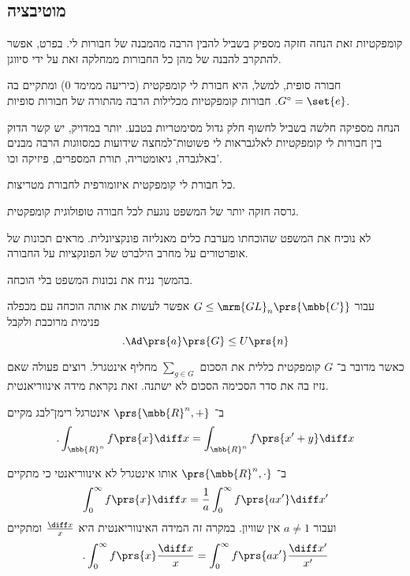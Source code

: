 \documentclass[10pt, twoside]{book}
\newcommand{\textenglish}[1]{\foreignlanguage{english}{#1}}
\begin{document}
\subsection{מוטיבציה}

קומפקטיות זאת הנחה חזקה מספיק בשביל להבין הרבה מהמבנה של חבורות לי. בפרט, אפשר להתקרב להבנה של מהן כל החבורות ממחלקה זאת על ידי סיווגן.

חבורה סופית, למשל, היא חבורת לי קומפקטית (כיריעה ממימד 0) ומתקיים בה
$G^\circ = \set{e}$.
חבורות קומפקטיות מכלילות הרבה מהתורה של חבורות סופיות.

הנחה מספיקה חלשה בשביל לחשוף חלק גדול מסימטריות בטבע. יותר במדויק, יש קשר הדוק בין חבורות לי קומפקטיות לאלגבראות לי פשוטות־למחצה שידועות כמסווגות הרבה מבנים באלגברה, גיאומטריה, תורת המספרים, פיזיקה וכו'.

\begin{theorem}[\textenglish{Peter-Weyl}]
כל חבורת לי קומפקטית איזומורפית לחבורת מטריצות.
\end{theorem}

\begin{remark}
גרסה חזקה יותר של המשפט נוגעת לכל חבורה טופולוגית קומפקטית.

לא נוכיח את המשפט שהוכחתו מערבת כלים מאנליזה פונקציונלית. מראים תכונות של אופרטורים על מחרב הילברט של הפונקציות על החבורה.

בהמשך נניח את נכונות המשפט בלי הוכחה.
\end{remark}



\begin{remark}
עבור
$G \leq \mrm{GL}_n\prs{\mbb{C}}$
אפשר לעשות את אותה הוכחה עם מכפלה פנימית מרוכבת ולקבל
\[\text{.} \Ad\prs{a}\prs{G} \leq U\prs{n}\]

כאשר מדובר ב־%
$G$
קומפקטית כללית את הסכום
$\sum_{g \in G}$
מחליף אינטגרל. רוצים פעולה שאם נזיז בה את סדר הסכימה הסכום לא ישתנה.
זאת נקראת מידה אינווריאנטית.
\end{remark}

\begin{example}
ב־%
$\prs{\mbb{R}^n, +}$
אינטרגל רימן־לבג מקיים
\[\text{.}\int_{\mbb{R}^n} f\prs{x} \diff x = \int_{\mbb{R}^n} f \prs{x' + y} \diff x\]

ב־%
$\prs{\mbb{R}^n, \cdot}$
אותו אינטגרל לא אינווריאנטי כי מתקיים
\[\int_0^\infty f\prs{x} \diff x = \frac{1}{a} \int_0^\infty f\prs{a x'} \diff x'\]
ועבור
$a \neq 1$
אין שוויון.
במקרה זה המידה האינווריאנטית היא
$\frac{\diff x}{x}$
ומתקיים
\[\text{.} \int_0^\infty f\prs{x} \frac{\diff x}{x} = \int_0^\infty f\prs{a x'} \frac{\diff x'}{x'}\]
\end{example}
\end{document}
